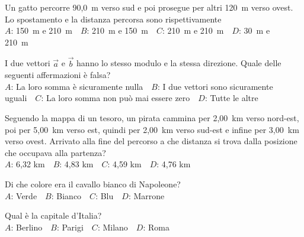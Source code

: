 \def\mcquestionnumber{11}


\mcquestionheader Un gatto percorre 90,0~m verso sud e poi prosegue per altri 120~m verso ovest. Lo spostamento e la distanza percorsa sono rispettivamente\\
{$A$}: 150~m e 210~m\ \ {$B$}: 210~m e 150~m\ \ {$C$}: 210~m e 210~m\ \ {$D$}: 30~m e 210~m\ \ 

\mcquestionfooter



\def\mcquestionnumber{12}


\mcquestionheader I due vettori $\vec{a}$ e $\vec{b}$ hanno lo stesso modulo e la stessa direzione. Quale delle seguenti affermazioni è falsa?\\
{$A$}: La loro somma è sicuramente nulla\ \ {$B$}: I due vettori sono sicuramente uguali\ \ {$C$}: La loro somma non può mai essere zero\ \ {$D$}: Tutte le altre\ \ 

\mcquestionfooter



\mcpaperfooter

\def\mcserialnumber{25}
\mcpaperheader


\def\mcquestionnumber{1}


\mcquestionheader Seguendo la mappa di un tesoro, un pirata cammina per 2,00~km verso nord-est, poi per 5,00~km verso est, quindi per 2,00~km verso sud-est e infine per 3,00~km verso ovest. Arrivato alla fine del percorso a che distanza si trova dalla posizione che occupava alla partenza?\\
{$A$}: 6,32 km\ \ {$B$}: 4,83 km\ \ {$C$}: 4,59 km\ \ {$D$}: 4,76 km\ \ 

\mcquestionfooter



\def\mcquestionnumber{2}


\mcquestionheader Di che colore era il cavallo bianco di Napoleone?\\
{$A$}: Verde\ \ {$B$}: Bianco\ \ {$C$}: Blu\ \ {$D$}: Marrone\ \ 

\mcquestionfooter



\def\mcquestionnumber{3}


\mcquestionheader Qual è la capitale d’Italia?\\
{$A$}: Berlino\ \ {$B$}: Parigi\ \ {$C$}: Milano\ \ {$D$}: Roma\ \ 

\mcquestionfooter



\def\mcquestionnumber{4}


